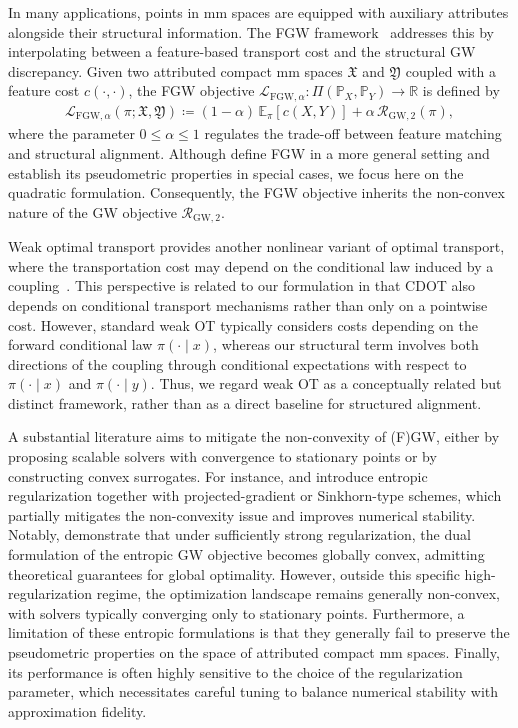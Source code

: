 \documentclass{article}
\theoremstyle{plain}
\theoremstyle{definition}
\theoremstyle{remark}
\begin{document}
In many applications, points in mm spaces are equipped with auxiliary attributes alongside their structural information. The FGW framework~\citep{vayer2020fused} addresses this by interpolating between a feature-based transport cost and the structural GW discrepancy. Given two attributed compact mm spaces $\mathfrak{X}$ and $\mathfrak{Y}$ coupled with a feature cost $c(\cdot,\cdot)$, the FGW objective $\mathcal{L}_{\mathrm{FGW},\alpha} : \Pi(\mathbb{P}_X,\mathbb{P}_Y) \to \mathbb{R}$ is defined by
\begin{align*}
	\mathcal{L}_{\mathrm{FGW},\alpha} (\pi ; \mathfrak{X},\mathfrak{Y}) \coloneqq (1-\alpha)\,\mathbb{E}_{\pi}\!\left[c(X,Y)\right] + \alpha\,\mathcal{R}_{\mathrm{GW},2}(\pi),
\end{align*}
where the parameter $0 \leq \alpha \leq 1$ regulates the trade-off between feature matching and structural alignment. Although \citet{vayer2020fused} define FGW in a more general setting and establish its pseudometric properties in special cases, we focus here on the quadratic formulation. Consequently, the FGW objective inherits the non-convex nature of the GW objective $\mathcal{R}_{\mathrm{GW},2}$.

Weak optimal transport provides another nonlinear variant of optimal transport, where the transportation cost may depend on the conditional law induced by a coupling~\citep{backhoff2022stability}. This perspective is related to our formulation in that CDOT also depends on conditional transport mechanisms rather than only on a pointwise cost. However, standard weak OT typically considers costs depending on the forward conditional law $\pi(\cdot \mid x)$, whereas our structural term involves both directions of the coupling through conditional expectations with respect to $\pi(\cdot \mid x)$ and $\pi(\cdot \mid y)$. Thus, we regard weak OT as a conceptually related but distinct framework, rather than as a direct baseline for structured alignment.

A substantial literature aims to mitigate the non-convexity of (F)GW, either by proposing scalable solvers with convergence to stationary points or by constructing convex surrogates. For instance, \citet{peyre2016gromov} and \citet{solomon2016entropic} introduce entropic regularization together with projected-gradient or Sinkhorn-type schemes, which partially mitigates the non-convexity issue and improves numerical stability. Notably, \citet{rioux2024entropic} demonstrate that under sufficiently strong regularization, the dual formulation of the entropic GW objective becomes globally convex, admitting theoretical guarantees for global optimality. However, outside this specific high-regularization regime, the optimization landscape remains generally non-convex, with solvers typically converging only to stationary points. Furthermore, a limitation of these entropic formulations is that they generally fail to preserve the pseudometric properties on the space of attributed compact mm spaces. Finally, its performance is often highly sensitive to the choice of the regularization parameter, which necessitates careful tuning to balance numerical stability with approximation fidelity.
\end{document}
